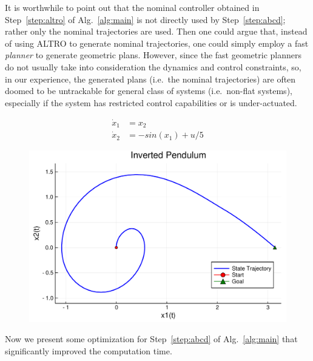 \begin{remark}
		It is worthwhile to point out that the nominal controller obtained in Step~\ref{step:altro} of Alg.~\ref{alg:main} is not directly used by Step~\ref{step:abcd}; rather only the nominal trajectories are used.
		Then one could argue that, instead of using ALTRO to generate nominal trajectories, one could simply employ a fast \emph{planner} \cite{rrt etc.} to generate geometric plans.
		However, since the fast geometric planners do not usually take into consideration the dynamics and control constraints, so, in our experience, the generated plans (i.e.\ the nominal trajectories) are often doomed to be untrackable for general class of systems (i.e.\ non-flat systems), especially if the system has restricted control capabilities or is under-actuated.
		
		\begin{align*}
			\dot{x}_1 &= x_2\\
   			\dot{x}_2 &= -sin(x_1) + u/5
		\end{align*}
	
		
		\begin{figure}
			\includegraphics[scale=0.2]{figures/2d_pendulum_spiral}
		\end{figure}
		

\end{remark}

Now we present some optimization for Step~\ref{step:abcd} of Alg.~\ref{alg:main} that significantly improved the computation time.

